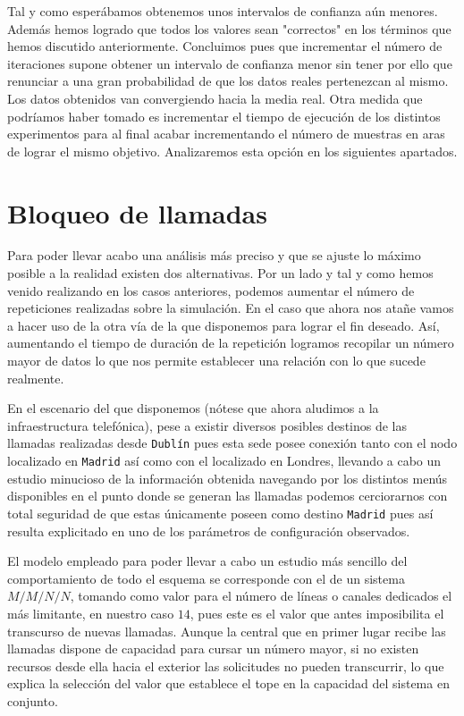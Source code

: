 \documentclass{article}[10pt]
\begin{document}
		\vskip 3mm

		Tal y como esperábamos obtenemos unos intervalos de confianza aún menores. Además hemos logrado que todos los valores sean "correctos" en los términos que hemos discutido anteriormente. Concluimos pues que incrementar el número de iteraciones supone obtener un intervalo de confianza menor sin tener por ello que renunciar a una gran probabilidad de que los datos reales pertenezcan al mismo. Los datos obtenidos van convergiendo hacia la media real. Otra medida que podríamos haber tomado es incrementar el tiempo de ejecución de los distintos experimentos para al final acabar incrementando el número de muestras en aras de lograr el mismo objetivo. Analizaremos esta opción en los siguientes apartados.

	\section{Bloqueo de llamadas}
		Para poder llevar acabo una análisis más preciso y que se ajuste lo máximo posible a la realidad existen dos alternativas. Por un lado y tal y como hemos venido realizando en los casos anteriores, podemos aumentar el número de repeticiones realizadas sobre la simulación. En el caso que ahora nos atañe vamos a hacer uso de la otra vía de la que disponemos para lograr el fin deseado. Así, aumentando el tiempo de duración de la repetición logramos recopilar un número mayor de datos lo que nos permite establecer una relación con lo que sucede realmente.

		En el escenario del que disponemos (nótese que ahora aludimos a la infraestructura telefónica), pese a existir diversos posibles destinos de las llamadas realizadas desde \texttt{Dublín} pues esta sede posee conexión tanto con el nodo localizado en \texttt{Madrid} así como con el localizado en Londres, llevando a cabo un estudio minucioso de la información obtenida navegando por los distintos menús disponibles en el punto donde se generan las llamadas podemos cerciorarnos con total seguridad de que estas únicamente poseen como destino \texttt{Madrid} pues así resulta explicitado en uno de los parámetros de configuración observados.

		El modelo empleado para poder llevar a cabo un estudio más sencillo del comportamiento de todo el esquema se corresponde con el de un sistema $M/M/N/N$, tomando como valor para el número de líneas o canales dedicados el más limitante, en nuestro caso $14$, pues este es el valor que antes imposibilita el transcurso de nuevas llamadas. Aunque la central que en primer lugar recibe las llamadas dispone de capacidad para cursar un número mayor, si no existen recursos desde ella hacia el exterior las solicitudes no pueden transcurrir, lo que explica la selección del valor que establece el tope en la capacidad del sistema en conjunto.
\end{document}
